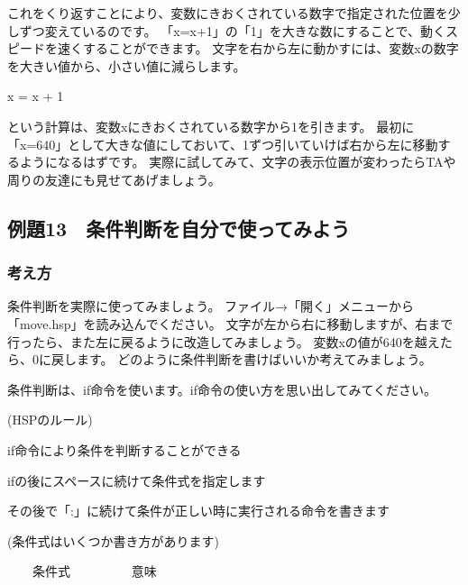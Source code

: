 \documentclass[text02.tex]{subfiles}
\begin{document}
これをくり返すことにより、変数にきおくされている数字で指定された位置を少しずつ変えているのです。
「x=x+1」の「1」を大きな数にすることで、動くスピードを速くすることができます。
文字を右から左に動かすには、変数xの数字を大きい値から、小さい値に減らします。

\begin{description}
    \item x = x + 1
\end{description}

という計算は、変数xにきおくされている数字から1を引きます。
最初に「x=640」として大きな値にしておいて、1ずつ引いていけば右から左に移動するようになるはずです。
実際に試してみて、文字の表示位置が変わったらTAや周りの友達にも見せてあげましょう。

\clearpage
\subsection{例題13　条件判断を自分で使ってみよう}

\subsubsection*{考え方}

条件判断を実際に使ってみましょう。
ファイル→「開く」メニューから「move.hsp」を読み込んでください。
文字が左から右に移動しますが、右まで行ったら、また左に戻るように改造してみましょう。
変数xの値が640を越えたら、0に戻します。
どのように条件判断を書けばいいか考えてみましょう。

条件判断は、if命令を使います。if命令の使い方を思い出してみてください。

\begin{description}
    \item (HSPのルール)
\end{description}

\begin{description}
    \item if命令により条件を判断することができる
    \item ifの後にスペースに続けて条件式を指定します
    \item その後で「:」に続けて条件が正しい時に実行される命令を書きます
\end{description}

\begin{description}
    \item (条件式はいくつか書き方があります)
\end{description}
\ \ \ \ 条件式 \ \ \ \ \ \ \ \ \ 意味
\end{document}
